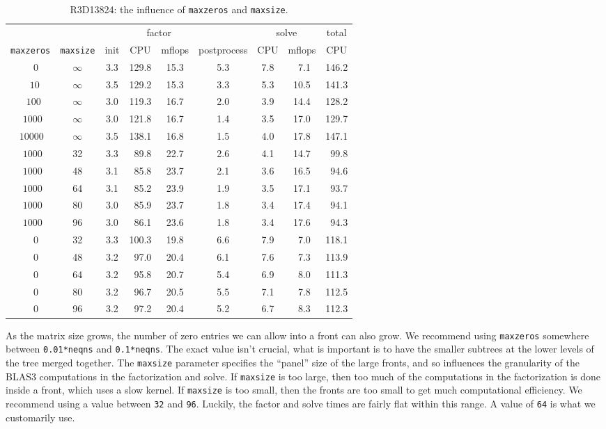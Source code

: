 \begin{table}[htbp]
\label{table:R3D13824-maxzero-maxsize}
\caption{R3D13824: the influence of {\tt maxzeros} and {\tt maxsize}.}
\begin{center}
\begin{tabular}{cc|ccccccc}
& & & \multicolumn{2}{c}{factor} & & \multicolumn{2}{c}{solve} & total\\
{\tt maxzeros} & {\tt maxsize} 
   & init & CPU & mflops & postprocess & CPU & mflops & CPU \\ \hline
$~~~~~0$ & $\infty$ & 3.3 & 129.8 & 15.3 & 5.3 & 7.8 & ~7.1 & 146.2 \\
$~~~~10$ & $\infty$ & 3.5 & 129.2 & 15.3 & 3.3 & 5.3 & 10.5 & 141.3 \\
$~~~100$ & $\infty$ & 3.0 & 119.3 & 16.7 & 2.0 & 3.9 & 14.4 & 128.2 \\
$~~1000$ & $\infty$ & 3.0 & 121.8 & 16.7 & 1.4 & 3.5 & 17.0 & 129.7 \\
$~10000$ & $\infty$ & 3.5 & 138.1 & 16.8 & 1.5 & 4.0 & 17.8 & 147.1 \\
$~~1000$ &    32    & 3.3 & ~89.8 & 22.7 & 2.6 & 4.1 & 14.7 & ~99.8 \\
$~~1000$ &    48    & 3.1 & ~85.8 & 23.7 & 2.1 & 3.6 & 16.5 & ~94.6 \\
$~~1000$ &    64    & 3.1 & ~85.2 & 23.9 & 1.9 & 3.5 & 17.1 & ~93.7 \\
$~~1000$ &    80    & 3.0 & ~85.9 & 23.7 & 1.8 & 3.4 & 17.4 & ~94.1 \\
$~~1000$ &    96    & 3.0 & ~86.1 & 23.6 & 1.8 & 3.4 & 17.6 & ~94.3 \\
$~~~~~0$ &    32    & 3.3 & 100.3 & 19.8 & 6.6 & 7.9 & ~7.0 & 118.1 \\
$~~~~~0$ &    48    & 3.2 & ~97.0 & 20.4 & 6.1 & 7.6 & ~7.3 & 113.9 \\
$~~~~~0$ &    64    & 3.2 & ~95.8 & 20.7 & 5.4 & 6.9 & ~8.0 & 111.3 \\
$~~~~~0$ &    80    & 3.2 & ~96.7 & 20.5 & 5.5 & 7.1 & ~7.8 & 112.5 \\
$~~~~~0$ &    96    & 3.2 & ~97.2 & 20.4 & 5.2 & 6.7 & ~8.3 & 112.3 
\end{tabular}
\end{center}
\end{table}
\par
\par
As the matrix size grows, the number of zero entries we can allow
into a front can also grow.
We recommend using {\tt maxzeros} somewhere between 
{\tt 0.01*neqns} and {\tt 0.1*neqns}.
The exact value isn't crucial, what is important is to have the
smaller subtrees at the lower levels of the tree merged together.
The {\tt maxsize} parameter specifies the ``panel'' size of the
large fronts, and so influences the granularity of the BLAS3
computations in the factorization and solve.
If {\tt maxsize} is too large, then too much of the computations
in the factorization is done inside a front, which uses a slow
kernel.
If {\tt maxsize} is too small, then the fronts are too small to get
much computational efficiency.
We recommend using a value between {\tt 32} and {\tt 96}.
Luckily, the factor and solve times are fairly flat within this
range.
A value of {\tt 64} is what we customarily use.
